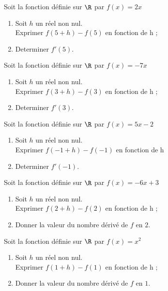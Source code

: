 \documentclass[11pt]{article}
\begin{document}
\begin{multicols}{2}
\begin{exercicedevoir}[2]
Soit la fonction définie sur $\R$ par $f(x)=2x$
\begin{enumerate}
\item Soit $h$ un réel non nul. \\
Exprimer $f(5+h)-f(5)$ en fonction de h ;
\item Determiner $f'(5)$.
\end{enumerate}
\end{exercicedevoir}
\begin{exercicedevoir}[2]
Soit la fonction définie sur $\R$ par $f(x)=-7x$
\begin{enumerate}
\item Soit $h$ un réel non nul. \\
Exprimer $f(3+h)-f(3)$ en fonction de h ;
\item Determiner $f'(3)$.
\end{enumerate}
\end{exercicedevoir}
\begin{exercicedevoir}[2]
Soit la fonction définie sur $\R$ par $f(x)=5x-2$
\begin{enumerate}
\item Soit $h$ un réel non nul. \\
Exprimer $f(-1+h)-f(-1)$ en fonction de h
\item Determiner $f'(-1)$.
\end{enumerate}
\end{exercicedevoir}
\begin{exercicedevoir}[2]
Soit la fonction définie sur $\R$ par $f(x)=-6x+3$
\begin{enumerate}
\item Soit $h$ un réel non nul. \\
Exprimer $f(2+h)-f(2)$ en fonction de h ;
\item Donner la valeur du nombre dérivé de $f$ en $2$.
\end{enumerate}
\end{exercicedevoir}
\end{multicols}
\begin{exercicedevoir}[3]
Soit la fonction définie sur $\R$ par $f(x)=x^2$
\begin{enumerate}
\item Soit $h$ un réel non nul. \\
Exprimer $f(1+h)-f(1)$ en fonction de h ;
\item Donner la valeur du nombre dérivé de $f$ en $1$.
\end{enumerate}
\end{exercicedevoir}
\nonewpage
\end{document}
